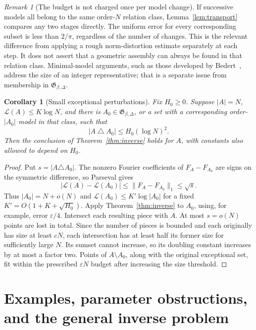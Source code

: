 \documentclass[11pt,reqno]{amsart}
\numberwithin{equation}{section}
\newtheorem{corollary}[theorem]{Corollary}
\theoremstyle{definition}
\theoremstyle{remark}
\newtheorem{remark}[theorem]{Remark}
\newcommand{\La}{\mathcal L}
\newcommand{\norm}[1]{\lVert#1\rVert}
\newcommand{\eps}{\varepsilon}
\begin{document}
\begin{remark}[The budget is not charged once per model change]
If successive models all belong to the same order-$N$ relation class,
Lemma~\ref{lem:transport} compares any two stages directly. The uniform
error for every corresponding subset is less than $2/\pi$, regardless
of the number of changes. This is the relevant difference from applying
a rough norm-distortion estimate separately at each step. It does not
assert that a geometric assembly can always be found in that relation
class. Minimal-model arguments, such as those developed by
Bedert~\cite{Bedert}, address the size of an integer representative;
that is a separate issue from membership in
$\mathfrak G_{\beta,\Delta}$.
\end{remark}

\begin{corollary}[Small exceptional perturbations]\label{cor:perturbations}
Fix $H_0\ge0$. Suppose $|A|=N$, $\La(A)\le K\log N$, and there is
$A_0\in\mathfrak G_{\beta,\Delta}$, or a set with a corresponding
order-$|A_0|$ model in that class, such that
\[
 |A\mathbin\triangle A_0|\le H_0(\log N)^2.
\]
Then the conclusion of Theorem~\ref{thm:inverse} holds for $A$, with
constants also allowed to depend on $H_0$.
\end{corollary}
\begin{proof}
Put $s=|A\triangle A_0|$. The nonzero Fourier coefficients of
$F_A-F_{A_0}$ are signs on the symmetric difference, so Parseval gives
\[
 |\La(A)-\La(A_0)|\le\norm{F_A-F_{A_0}}_1\le\sqrt s.
\]
Thus $|A_0|=N+o(N)$ and
$\La(A_0)\le K'\log|A_0|$ for a fixed
$K'=O(1+K+\sqrt{H_0})$. Apply Theorem~\ref{thm:inverse} to $A_0$,
using, for example, error $\eps/4$. Intersect each resulting piece
with $A$. At most $s=o(N)$ points are lost in total. Since the number
of pieces is bounded and each originally has size at least $cN$,
each intersection has at least half its former size for sufficiently
large $N$. Its sumset cannot increase, so its doubling constant
increases by at most a factor two. Points of $A\setminus A_0$, along
with the original exceptional set, fit within the prescribed $\eps N$
budget after increasing the size threshold.
\end{proof}

\section{Examples, parameter obstructions, and the general inverse problem}
\label{sec:scope}
\end{document}
